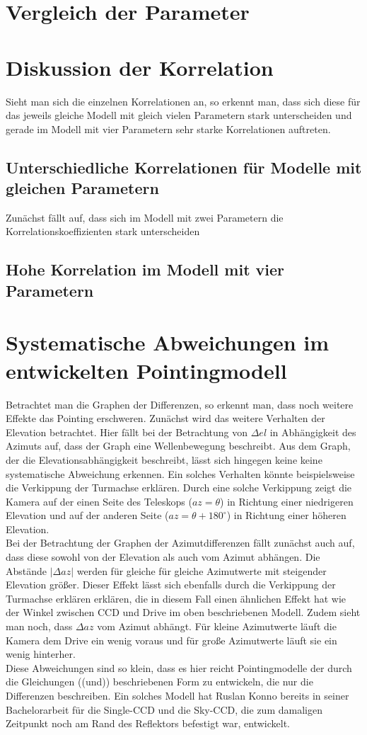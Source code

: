 \section{Vergleich der Parameter}

\section{Diskussion der Korrelation}
Sieht man sich die einzelnen Korrelationen an, so erkennt man, dass sich diese für das jeweils gleiche Modell mit gleich vielen Parametern stark unterscheiden und gerade im Modell mit vier Parametern sehr starke Korrelationen auftreten.
\subsection{Unterschiedliche Korrelationen für Modelle mit gleichen Parametern}
Zunächst fällt auf, dass sich im Modell mit zwei Parametern die Korrelationskoeffizienten stark unterscheiden
\subsection{Hohe Korrelation im Modell mit vier Parametern}

\section{Systematische Abweichungen im entwickelten Pointingmodell}
Betrachtet man die Graphen der Differenzen, so erkennt man, dass noch weitere Effekte das Pointing erschweren. Zunächst wird das weitere Verhalten der Elevation betrachtet. Hier fällt bei der Betrachtung von $\Delta el$ in Abhängigkeit des Azimuts auf, dass der Graph eine Wellenbewegung beschreibt. Aus dem Graph, der die Elevationsabhängigkeit beschreibt, lässt sich hingegen keine keine systematische Abweichung erkennen. Ein solches Verhalten könnte beispielsweise die Verkippung der Turmachse erklären. Durch eine solche Verkippung zeigt die Kamera auf der einen Seite des Teleskops ($az=\theta$) in Richtung einer niedrigeren Elevation und auf der anderen Seite ($az=\theta+180^{\circ}$) in Richtung einer höheren Elevation.\\
Bei der Betrachtung der Graphen der Azimutdifferenzen fällt zunächst auch auf, dass diese sowohl von der Elevation als auch vom Azimut abhängen. Die Abstände $\left| \Delta az \right|$ werden für gleiche für gleiche Azimutwerte mit steigender Elevation größer. Dieser Effekt lässt sich ebenfalls durch die Verkippung der Turmachse erklären erklären, die in diesem Fall einen ähnlichen Effekt hat wie der Winkel zwischen CCD und Drive im oben beschriebenen Modell. Zudem sieht man noch, dass $\Delta az$ vom Azimut abhängt. Für kleine Azimutwerte läuft die Kamera dem Drive ein wenig voraus und für große Azimutwerte läuft sie ein wenig hinterher.\\
Diese Abweichungen sind so klein, dass es hier reicht Pointingmodelle der durch die Gleichungen ((und)) beschriebenen Form zu entwickeln, die nur die Differenzen beschreiben. Ein solches Modell hat Ruslan Konno bereits in seiner Bachelorarbeit für die Single-CCD und die Sky-CCD, die zum damaligen Zeitpunkt noch am Rand des Reflektors befestigt war, entwickelt. 
